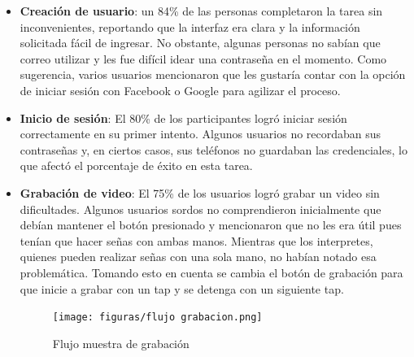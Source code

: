 \begin{itemize}
    \item \textbf{Creación de usuario}: un 84\% de las personas completaron la tarea sin inconvenientes, reportando que la interfaz era clara y la información solicitada fácil de ingresar. No obstante, algunas personas no sabían que correo utilizar y les fue difícil idear una contraseña en el momento. Como sugerencia, varios usuarios mencionaron que les gustaría contar con la opción de iniciar sesión con Facebook o Google para agilizar el proceso.
    \item \textbf{Inicio de sesión}: El 80\% de los participantes logró iniciar sesión correctamente en su primer intento. Algunos usuarios no recordaban sus contraseñas y, en ciertos casos, sus teléfonos no guardaban las credenciales, lo que afectó el porcentaje de éxito en esta tarea.
    \item \textbf{Grabación de video}: El 75\% de los usuarios logró grabar un video sin dificultades. Algunos usuarios sordos no comprendieron inicialmente que debían mantener el botón presionado y mencionaron que no les era útil pues tenían que hacer señas con ambas manos. Mientras que los interpretes, quienes pueden realizar señas con una sola mano, no habían notado esa problemática. Tomando esto en cuenta se cambia el botón de grabación para que inicie a grabar con un tap y se detenga con un siguiente tap. 
        
        \begin{figure} [H]
            \centering
            \texttt{[image: figuras/flujo grabacion.png]}
            \caption{Flujo muestra de grabación}
            \label{fig:enter-label}
        \end{figure}
                

\end{itemize}
